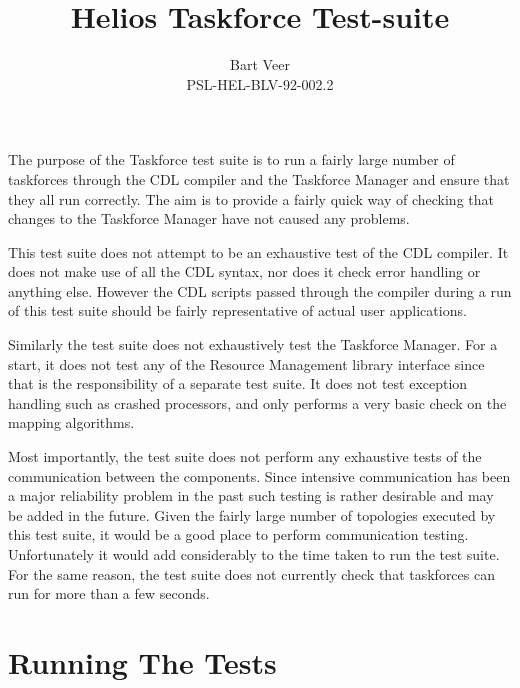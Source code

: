 \title{Helios Taskforce Test-suite}
\author{Bart Veer \\ PSL-HEL-BLV-92-002.2}



\maketitle

The purpose of the Taskforce test suite is to run a fairly large number of
taskforces through the CDL compiler and the Taskforce Manager and ensure that
they all run correctly. The aim is to provide a fairly quick way
of checking that changes to the Taskforce Manager have not caused any
problems.

This test suite does not attempt to be an exhaustive test of the CDL
compiler. It does not make use of all the CDL syntax, nor does it check
error handling or anything else. However the CDL scripts passed through
the compiler during a run of this test suite should be fairly
representative of actual user applications.

Similarly the test suite does not exhaustively test the Taskforce Manager.
For a start, it does not test any of the Resource Management library
interface since that is the responsibility of a separate test suite.
It does not test exception handling such as crashed processors, and only
performs a very basic check on the mapping algorithms.

Most importantly, the test suite does not perform any exhaustive tests
of the communication between the components. Since intensive
communication has been a major reliability problem in the past such
testing is rather desirable and may be added in the future. Given the
fairly large number of topologies executed by this test suite,
it would be a good place to perform communication testing. Unfortunately
it would add considerably to the time taken to run the test suite.
For the same reason, the test suite does not currently check that
taskforces can run for more than a few seconds.

\section{Running The Tests}

